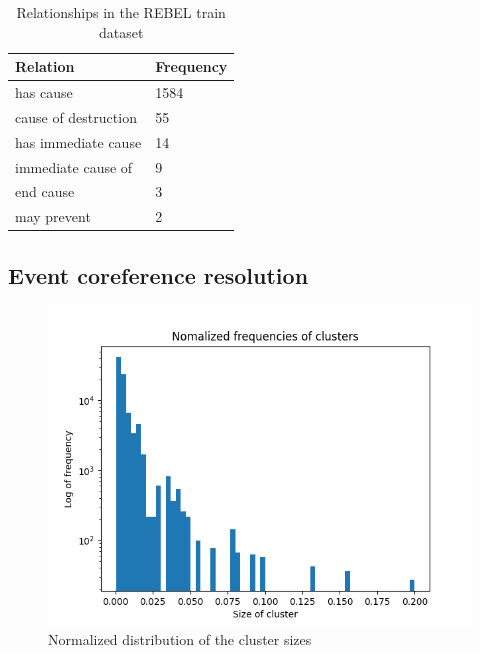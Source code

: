 \documentclass[
hf, %
]{ceurart}
\begin{document}
\begin{table}[!h]
	\centering
	\begin{tabular}{|l|l|}
		\hline
		\textbf{Relation}    & \textbf{Frequency} \\ \hline
		has cause            & 1584               \\ \hline
		cause of destruction & 55                 \\ \hline
		has immediate cause  & 14                 \\ \hline
		immediate cause of   & 9                  \\ \hline
		end cause            & 3                  \\ \hline
		may prevent          & 2                  \\ \hline
	\end{tabular}
	\caption{Relationships in the REBEL train dataset}
	\label{apx:rebel_rel}
\end{table}

\subsection{Event coreference resolution}

\begin{figure}[!h]
	\centering
	\includegraphics[scale=0.5]{Images/norm_freq_cluster_size.png}
	\caption{Normalized distribution of the cluster sizes}
	\label{fig:norm_freq_cluster_size}
\end{figure}
\end{document}
